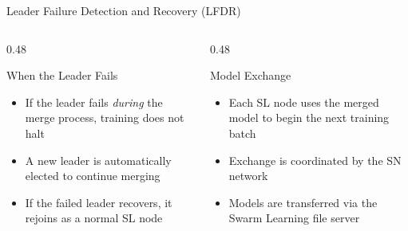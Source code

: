\documentclass[aspectratio=169]{beamer}
\begin{document}
\begin{frame}{Leader Failure Detection and Recovery (LFDR)}
    \begin{columns}[T]
        \begin{column}{0.48\textwidth}
            \begin{alertblock}{When the Leader Fails}
                \begin{itemize}
                    \item If the leader fails \textit{during} the merge process, training does not halt
                    \item A new leader is automatically elected to continue merging
                    \item If the failed leader recovers, it rejoins as a normal SL node
                \end{itemize}
            \end{alertblock}
        \end{column}
        \begin{column}{0.48\textwidth}
            \begin{block}{Model Exchange}
                \begin{itemize}
                    \item Each SL node uses the merged model to begin the next training batch
                    \item Exchange is coordinated by the SN network
                    \item Models are transferred via the Swarm Learning file server
                \end{itemize}
            \end{block}
        \end{column}
    \end{columns}
\end{frame}
\end{document}
